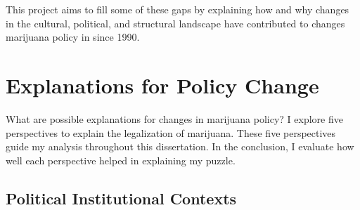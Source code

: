 
This project aims to fill some of these gaps by explaining how and why changes in the cultural, political, and structural landscape have contributed to changes marijuana policy in since 1990.


\section{Explanations for Policy Change}

What are possible explanations for changes in marijuana policy? I explore five perspectives to explain the legalization of marijuana. These five perspectives guide my analysis throughout this dissertation. In the conclusion, I evaluate how well each perspective helped in explaining my puzzle.







\subsection{Political Institutional Contexts}


